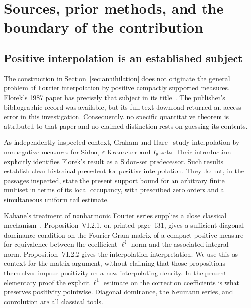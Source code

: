 
\section{Sources, prior methods, and the boundary of the contribution}
\label{sec:sources-literature}

\subsection{Positive interpolation is an established subject}

The construction in Section~\ref{sec:annihilation} does not originate
the general problem of Fourier interpolation by positive compactly
supported measures. Florek's 1987 paper has precisely that subject
in its title~\cite{Florek}. The publisher's bibliographic record was
available, but its full-text download returned an access error in
this investigation. Consequently, no specific quantitative theorem
is attributed to that paper and no claimed distinction rests on
guessing its contents.

As independently inspected context, Graham and Hare~\cite{GrahamHare}
study interpolation by nonnegative measures for Sidon,
$\varepsilon$-Kronecker and $I_0$ sets. Their introduction explicitly
identifies Florek's result as a Sidon-set predecessor. Such results
establish clear historical precedent for positive interpolation.
They do not, in the passages inspected, state the present support
bound for an arbitrary finite multiset in terms of its local
occupancy, with prescribed zero orders and a simultaneous uniform
tail estimate.

Kahane's treatment of nonharmonic Fourier series supplies a close
classical mechanism~\cite{Kahane}. Proposition~VI.2.1, on printed
page~131, gives a sufficient diagonal-dominance condition on the
Fourier Gram matrix of a compact positive measure for equivalence
between the coefficient $\ell^2$ norm and the associated integral
norm. Proposition~VI.2.2 gives the interpolation interpretation.
We use this as context for the matrix argument, without claiming
that those propositions themselves impose positivity on a new
interpolating density. In the present elementary proof the explicit
$\ell^1$ estimate on the correction coefficients is what preserves
positivity pointwise. Diagonal dominance, the Neumann series, and
convolution are all classical tools.

